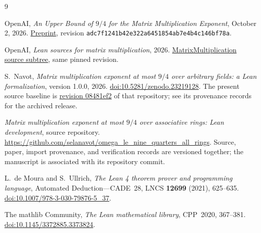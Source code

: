 \documentclass[11pt]{article}
\theoremstyle{remark}
\numberwithin{equation}{section}
\begin{document}
\begin{thebibliography}{9}
\raggedright
{}
OpenAI, \emph{An Upper Bound of $9/4$ for the Matrix Multiplication
Exponent}, October 2, 2026.
\href{https://github.com/openai/math/blob/adc7f1241b42e322a6451854ab7e4b4c146bf78a/preprints/Matrix-Multiplication-Nine-Fourths-October-2-2026/paper.pdf}{Preprint},
revision \texttt{adc7f1241b42e322a6451854ab7e4b4c146bf78a}.

OpenAI, \emph{Lean sources for matrix multiplication}, 2026.
\href{https://github.com/openai/math/tree/adc7f1241b42e322a6451854ab7e4b4c146bf78a/lean/OAI/LinearAlgebra/MatrixMultiplication}{MatrixMultiplication source subtree},
same pinned revision.

S.~Navot, \emph{Matrix multiplication exponent at most $9/4$ over
arbitrary fields: a Lean formalization}, version 1.0.0, 2026.
\href{https://doi.org/10.5281/zenodo.23219128}{doi:10.5281/zenodo.23219128}.
The present source baseline is
\href{https://github.com/selanavot/matrix-multiplication-all-fields/tree/08481ef22bca7dc9ffba091083b7c1e81e537220}{revision 08481ef2}
of that repository; see its provenance records for the archived release.

\emph{Matrix multiplication exponent at most $9/4$ over associative
rings: Lean development}, source repository.
\url{https://github.com/selanavot/omega_le_nine_quarters_all_rings}.
Source, paper, import provenance, and verification records are versioned
together; the manuscript is associated with its repository commit.

L.~de Moura and S.~Ullrich, \emph{The Lean 4 theorem prover and
programming language}, Automated Deduction---CADE~28,
LNCS \textbf{12699} (2021), 625--635.
\href{https://doi.org/10.1007/978-3-030-79876-5_37}{doi:10.1007/978-3-030-79876-5\_37}.

The mathlib Community, \emph{The Lean mathematical library},
CPP~2020, 367--381.
\href{https://doi.org/10.1145/3372885.3373824}{doi:10.1145/3372885.3373824}.
\end{thebibliography}
\end{document}
